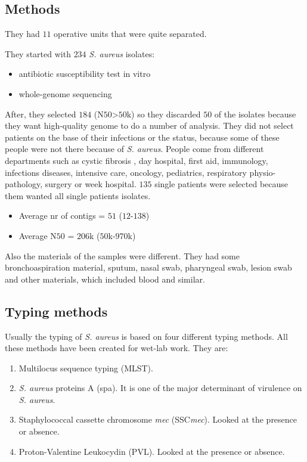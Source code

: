 \subsection{Methods}

They had $11$ operative units that were quite separated. 

They started with $234$ \emph{S. aureus} isolates:

\begin{itemize}
    \item antibiotic susceptibility test in vitro
    \item whole-genome sequencing
\end{itemize}

After, they selected $184$ (N$50$>$50$k) so they discarded $50$ of the isolates because they want high-quality genome to do a number of analysis.
They did not select patients on the base of their infections or the status, because some of these people were not there because of \emph{S. aureus}.
People come from different departments such as cystic fibrosis , day hospital, first aid, immunology, infections diseases, intensive care, oncology, pediatrics, respiratory physio-pathology, surgery or week hospital. 
$135$ single patients were selected because them wanted all single patients isolates. 

\begin{itemize}
    \item Average nr of contigs = $51$ ($12$-$138$)
    \item Average N$50$ = $206$k ($50$k-$970$k)
\end{itemize}

Also the materials of the samples were different. They had some bronchoaspiration material, sputum, nasal swab, pharyngeal swab, lesion swab and other materials, which included blood and similar.


\subsection{Typing methods}

Usually the typing of \emph{S. aureus} is based on four different typing methods. All these methods have been created for wet-lab work. They are:

\begin{enumerate}
    \item Multilocus sequence typing (MLST).
    \item \emph{S. aureus} proteins A (spa). It is one of the major determinant of virulence on \emph{S. aureus}.
    \item Staphylococcal cassette chromosome \emph{mec} (SSC\emph{mec}). Looked at the presence or absence.
    \item Proton-Valentine Leukocydin (PVL). Looked at the presence or absence.
\end{enumerate}

